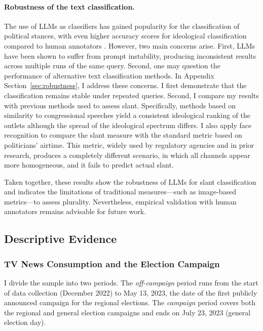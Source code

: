 \documentclass[12pt]{article}
\begin{document}
	\FloatBarrier
	
	\paragraph{Robustness of the text classification.}
	
	The use of LLMs as classifiers has gained popularity for the classification of political stances, with even higher accuracy scores for ideological classification compared to human annotators \citep[see, e.g.,][]{lemens,tornberg2023,Gilardi2023ChatGPTOC}. However, two main concerns arise. First, LLMs have been shown to suffer from prompt instability, producing inconsistent results across multiple runs of the same query. Second, one may question the performance of alternative text classification methods. In Appendix Section~\ref{sec:robustness}, I address these concerns. I first demonstrate that the classification remains stable under repeated queries. Second, I compare my results with previous methods used to assess slant. Specifically, methods based on similarity to congressional speeches \citep{gentzkow2010media,laver2003extracting} yield a consistent ideological ranking of the outlets although the spread of the ideological spectrum differs. I also apply face recognition to compare the slant measure with the standard metric based on politicians’ airtime. This metric, widely used by regulatory agencies and in prior research, produces a completely different scenario, in which all channels appear more homogeneous, and it fails to predict actual slant.
	
	Taken together, these results show the robustness of LLMs for slant classification and indicates the limitations of traditional measures—such as image-based metrics—to assess plurality. Nevertheless, empirical validation with human annotators remains advisable for future work.
	
	
	

	\subsection{Descriptive Evidence}


	\subsubsection*{TV News Consumption and the Election Campaign}

	
	
	
	I divide the sample into two periods. The \textit{off-campaign} period runs from the start of data collection (December 2022) to May 13, 2023, the date of the first publicly announced campaign for the regional elections. The \textit{campaign} period covers both the regional and general election campaigns and ends on July 23, 2023 (general election day). 
	
\end{document}
